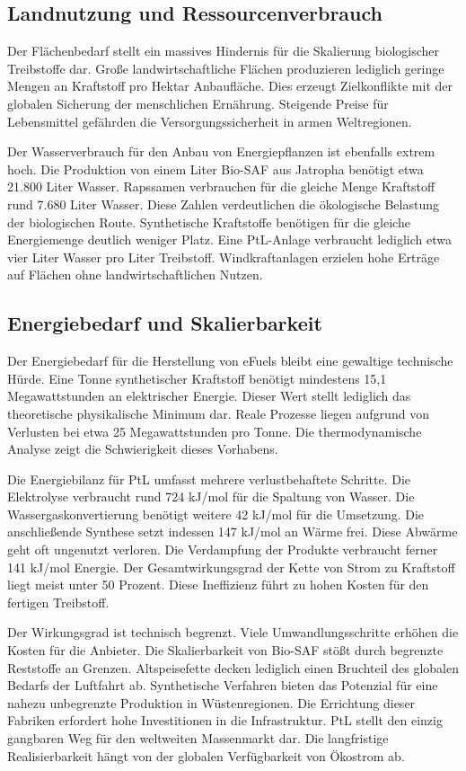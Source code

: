 \documentclass[12pt,a4paper]{article}
\begin{document}
\subsection{Landnutzung und Ressourcenverbrauch}
Der Flächenbedarf stellt ein massives Hindernis für die Skalierung biologischer Treibstoffe dar. Große landwirtschaftliche Flächen produzieren lediglich geringe Mengen an Kraftstoff pro Hektar Anbaufläche. Dies erzeugt Zielkonflikte mit der globalen Sicherung der menschlichen Ernährung. Steigende Preise für Lebensmittel gefährden die Versorgungssicherheit in armen Weltregionen. 

Der Wasserverbrauch für den Anbau von Energiepflanzen ist ebenfalls extrem hoch. Die Produktion von einem Liter Bio-SAF aus Jatropha benötigt etwa 21.800 Liter Wasser. Rapssamen verbrauchen für die gleiche Menge Kraftstoff rund 7.680 Liter Wasser. Diese Zahlen verdeutlichen die ökologische Belastung der biologischen Route. Synthetische Kraftstoffe benötigen für die gleiche Energiemenge deutlich weniger Platz. Eine PtL-Anlage verbraucht lediglich etwa vier Liter Wasser pro Liter Treibstoff. Windkraftanlagen erzielen hohe Erträge auf Flächen ohne landwirtschaftlichen Nutzen.

\subsection{Energiebedarf und Skalierbarkeit}
Der Energiebedarf für die Herstellung von eFuels bleibt eine gewaltige technische Hürde. Eine Tonne synthetischer Kraftstoff benötigt mindestens 15,1 Megawattstunden an elektrischer Energie. Dieser Wert stellt lediglich das theoretische physikalische Minimum dar. Reale Prozesse liegen aufgrund von Verlusten bei etwa 25 Megawattstunden pro Tonne. Die thermodynamische Analyse zeigt die Schwierigkeit dieses Vorhabens. 

Die Energiebilanz für PtL umfasst mehrere verlustbehaftete Schritte. Die Elektrolyse verbraucht rund 724 kJ/mol für die Spaltung von Wasser. Die Wassergaskonvertierung benötigt weitere 42 kJ/mol für die Umsetzung. Die anschließende Synthese setzt indessen 147 kJ/mol an Wärme frei. Diese Abwärme geht oft ungenutzt verloren. Die Verdampfung der Produkte verbraucht ferner 141 kJ/mol Energie. Der Gesamtwirkungsgrad der Kette von Strom zu Kraftstoff liegt meist unter 50 Prozent. Diese Ineffizienz führt zu hohen Kosten für den fertigen Treibstoff. 

Der Wirkungsgrad ist technisch begrenzt. Viele Umwandlungsschritte erhöhen die Kosten für die Anbieter. Die Skalierbarkeit von Bio-SAF stößt durch begrenzte Reststoffe an Grenzen. Altspeisefette decken lediglich einen Bruchteil des globalen Bedarfs der Luftfahrt ab. Synthetische Verfahren bieten das Potenzial für eine nahezu unbegrenzte Produktion in Wüstenregionen. Die Errichtung dieser Fabriken erfordert hohe Investitionen in die Infrastruktur. PtL stellt den einzig gangbaren Weg für den weltweiten Massenmarkt dar. Die langfristige Realisierbarkeit hängt von der globalen Verfügbarkeit von Ökostrom ab.
\end{document}
